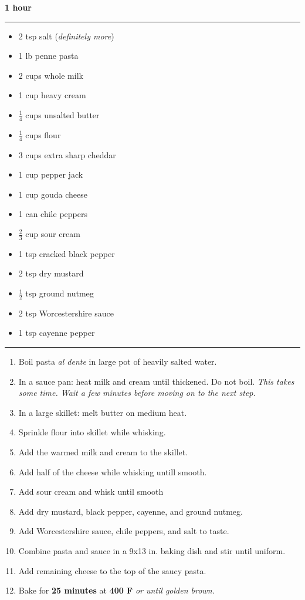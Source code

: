  \hfill {\large \textbf{1 hour}}

\vspace{15pt} \hrule \vspace{15pt}
\begin{itemize}
	\item 2 tsp salt (\textit{definitely more})
	\item 1 lb penne pasta
	\item 2 cups whole milk
	\item 1 cup heavy cream
	\item $\frac{1}{4}$ cups unsalted butter
	\item $\frac{1}{4}$ cups flour
	\item 3 cups extra sharp cheddar
	\item 1 cup pepper jack
	\item 1 cup gouda cheese
	\item 1 can chile peppers
	\item $\frac{2}{3}$ cup sour cream
	\item 1 tsp cracked black pepper
	\item 2 tsp dry mustard
	\item $\frac{1}{2}$ tsp ground nutmeg
	\item 2 tsp Worcestershire sauce
	\item 1 tsp cayenne pepper
\end{itemize}

\vspace{15pt} \hrule \vspace{15pt}
\begin{enumerate}
	\item Boil pasta \textit{al dente} in large pot of heavily salted water.
	\item In a sauce pan: heat milk and cream until thickened. Do not boil. \textit{This takes some time. Wait a few minutes before moving on to the next step.}
	\item In a large skillet: melt butter on medium heat.
	\item Sprinkle flour into skillet while whisking.
	\item Add the warmed milk and cream to the skillet.
	\item Add half of the cheese while whisking untill smooth.
	\item Add sour cream and whisk until smooth
	\item Add dry mustard, black pepper, cayenne, and ground nutmeg.
	\item Add Worcestershire sauce, chile peppers, and salt to taste.
	\item Combine pasta and sauce in a 9x13 in. baking dish and stir until uniform.
	\item Add remaining cheese to the top of the saucy pasta.
	\item Bake for \textbf{25 minutes} at \textbf{400 F} \textit{or until golden brown.}
\end{enumerate}
